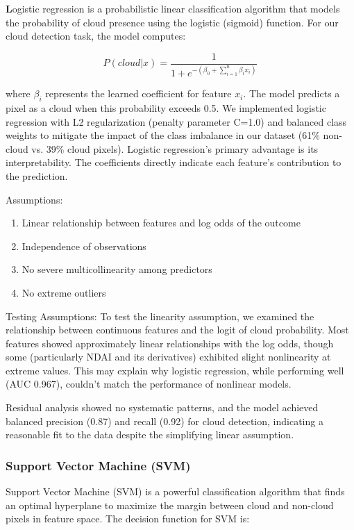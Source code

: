 \documentclass[10pt,letterpaper]{article}
\begin{document}
\textbf Logistic regression is a probabilistic linear classification algorithm that models the probability of cloud presence using the logistic (sigmoid) function. For our cloud detection task, the model computes:

\begin{equation}
P(cloud | x) = \frac{1}{1 + e^{-(\beta_0 + \sum_{i=1}^{n} \beta_i x_i)}}
\end{equation}

where $\beta_i$ represents the learned coefficient for feature $x_i$. The model predicts a pixel as a cloud when this probability exceeds 0.5. We implemented logistic regression with L2 regularization (penalty parameter C=1.0) and balanced class weights to mitigate the impact of the class imbalance in our dataset (61\% non-cloud vs. 39\% cloud pixels). Logistic regression's primary advantage is its interpretability. The coefficients directly indicate each feature's contribution to the prediction.

Assumptions:
\begin{enumerate}
    \item Linear relationship between features and log odds of the outcome
    \item Independence of observations
    \item No severe multicollinearity among predictors
    \item No extreme outliers
\end{enumerate}

Testing Assumptions:
To test the linearity assumption, we examined the relationship between continuous features and the logit of cloud probability. Most features showed approximately linear relationships with the log odds, though some (particularly NDAI and its derivatives) exhibited slight nonlinearity at extreme values. This may explain why logistic regression, while performing well (AUC 0.967), couldn't match the performance of nonlinear models.

Residual analysis showed no systematic patterns, and the model achieved balanced precision (0.87) and recall (0.92) for cloud detection, indicating a reasonable fit to the data despite the simplifying linear assumption.

\subsubsection{Support Vector Machine (SVM)}

Support Vector Machine (SVM) is a powerful classification algorithm that finds an optimal hyperplane to maximize the margin between cloud and non-cloud pixels in feature space. The decision function for SVM is:
\end{document}
